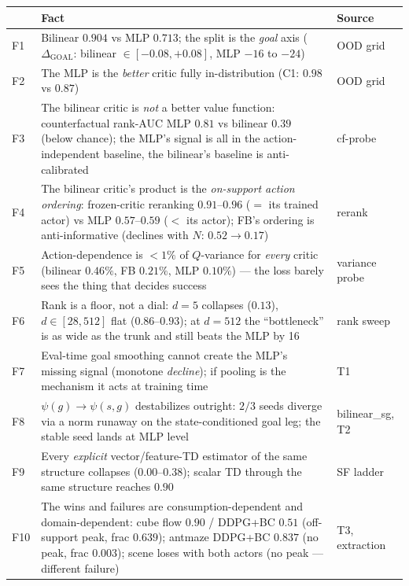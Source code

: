 \documentclass[11pt]{article}
\theoremstyle{definition}
\theoremstyle{remark}
\begin{document}
\begin{center}\small
\renewcommand{\arraystretch}{1.22}
\begin{tabular}{@{}l p{10.4cm} l@{}}
\toprule
 & Fact & Source \\
\midrule
F1 & Bilinear $0.904$ vs MLP $0.713$; the split is the \emph{goal} axis
($\Delta_{\mathrm{GOAL}}$: bilinear $\in[-0.08,+0.08]$, MLP $-16$ to $-24$) & OOD grid \\
F2 & The MLP is the \emph{better} critic fully in-distribution (C1: $0.98$ vs $0.87$) & OOD
grid \\
F3 & The bilinear critic is \emph{not} a better value function: counterfactual rank-AUC MLP
$0.81$ vs bilinear $0.39$ (below chance); the MLP's signal is all in the action-independent
baseline, the bilinear's baseline is anti-calibrated & cf-probe \\
F4 & The bilinear critic's product is the \emph{on-support action ordering}: frozen-critic
reranking $0.91$--$0.96$ ($=$ its trained actor) vs MLP $0.57$--$0.59$ ($<$ its actor); FB's
ordering is anti-informative (declines with $N$: $0.52\to0.17$) & rerank \\
F5 & Action-dependence is $<1\%$ of $Q$-variance for \emph{every} critic (bilinear
$0.46\%$, FB $0.21\%$, MLP $0.10\%$) --- the loss barely sees the thing that decides success
& variance probe \\
F6 & Rank is a floor, not a dial: $d{=}5$ collapses ($0.13$), $d\in[28,512]$ flat
($0.86$--$0.93$); at $d{=}512$ the ``bottleneck'' is as wide as the trunk and still beats the
MLP by 16 & rank sweep \\
F7 & Eval-time goal smoothing cannot create the MLP's missing signal (monotone
\emph{decline}); if pooling is the mechanism it acts at training time & T1 \\
F8 & $\psi(g)\to\psi(s,g)$ destabilizes outright: $2/3$ seeds diverge via a norm runaway on
the state-conditioned goal leg; the stable seed lands at MLP level & bilinear\_sg, T2 \\
F9 & Every \emph{explicit} vector/feature-TD estimator of the same structure collapses
($0.00$--$0.38$); scalar TD through the same structure reaches $0.90$ & SF ladder \\
F10 & The wins and failures are consumption-dependent and domain-dependent: cube
flow $0.90$ / DDPG+BC $0.51$ (off-support peak, frac $0.639$); antmaze DDPG+BC $0.837$ (no
peak, frac $0.003$); scene loses with both actors (no peak --- different failure) & T3,
extraction \\
\bottomrule
\end{tabular}
\end{center}
\end{document}
